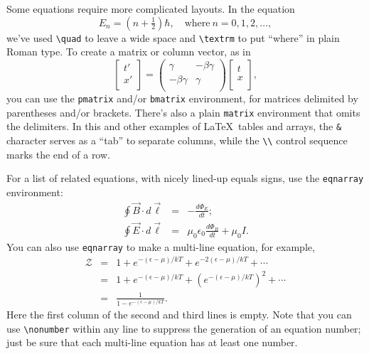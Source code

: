 \documentclass[prb,preprint]{revtex4-1}
\begin{document}
Some equations require more complicated layouts. In the equation
\begin{equation}
E_n = (n + \tfrac12)\hbar, \quad \textrm{where}\  n = 0, 1, 2, \ldots,
\end{equation}
we've used \verb/\quad/ to leave a wide space and \verb/\textrm/ to put ``where'' 
in plain Roman type.  To create a matrix or column vector, as in
\begin{equation}
\begin{bmatrix}
	t' \\
	x' \\
\end{bmatrix}
=
\begin{pmatrix}
	 \gamma & -\beta\gamma \\
	-\beta\gamma & \gamma \\
\end{pmatrix}
\begin{bmatrix}
	t \\
	x \\
\end{bmatrix},
\end{equation}
you can use the \texttt{pmatrix} and/or \texttt{bmatrix} environment, 
for matrices delimited by parentheses and/or brackets.  There's also
a plain \texttt{matrix} environment that omits the delimiters.
In this and other examples of \LaTeX\ tables and arrays, the \verb/&/ 
character serves as a ``tab'' to separate columns, while the \verb/\\/ 
control sequence marks the end of a row.

For a list of related equations, with nicely lined-up equals signs, 
use the \texttt{eqnarray} environment:
\begin{eqnarray}
\oint \vec B \cdot d\vec\ell & = & -\frac{d\Phi_E}{dt} ; \\
\oint \vec E \cdot d\vec\ell & = & \mu_0\epsilon_0\frac{d\Phi_B}{dt} + \mu_0 I.
\end{eqnarray}
You can also use \texttt{eqnarray} to make a multi-line equation, for example,
\begin{eqnarray}
\mathcal{Z} 
& = & 1 + e^{-(\epsilon-\mu)/kT} + e^{-2(\epsilon-\mu)/kT} + \cdots \nonumber \\
& = & 1 + e^{-(\epsilon-\mu)/kT} + (e^{-(\epsilon-\mu)/kT})^2 + \cdots \nonumber \\
& = & \frac{1}{1 - e^{-(\epsilon-\mu)/kT}}.
\end{eqnarray}
Here the first column of the second and third lines is empty.  Note that you 
can use \verb/\nonumber/ within any line to suppress the generation of
an equation number; just be sure that each multi-line equation has at least 
one number.
\end{document}
